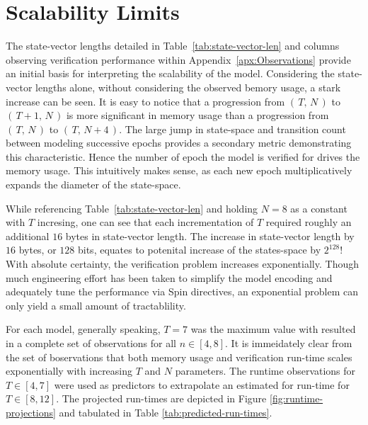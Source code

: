 \hypertarget{sec:scalability-limits}{%
\section{Scalability Limits}\label{sec:scalability-limits}}

The state-vector lengths detailed in Table\ \ref{tab:state-vector-len} and columns observing verification performance within Appendix\ \ref{apx:Observations} provide an initial basis for interpreting the scalability of the  model.
Considering the state-vector lengths alone, without considering the observed bemory usage, a stark increase can be seen.
It is easy to notice that a progression from \( (\,T,\, N\,) \) to \( (\,T+1,\, N\,) \) is more significant in memory usage than a progression from \( (\,T,\, N\,) \) to \( (\,T,\, N+4\,) \).
The large jump in state-space and transition count between modeling successive epochs provides a secondary metric demonstrating this characteristic.
Hence the number of epoch the model is verified for drives the memory usage.
This intuitively makes sense, as each new epoch multiplicatively expands the diameter of the state-space.

While referencing Table\ \ref{tab:state-vector-len} and holding \(N = 8\) as a constant with \(T\) incresing, one can see that each incrementation of \(T\) required roughly an additional \(16\) bytes in state-vector length.
The increase in state-vector length by \(16\) bytes, or \(128\) bits, equates to potenital increase of the states-space by \(2^{128}\)!
With absolute certainty, the verification problem increases exponentially.
Though much engineering effort has been taken to simplify the model encoding and adequately tune the performance via Spin directives, an exponential problem can only yield a small amount of tractablility.

For each model, generally speaking, \(T = 7\) was the maximum value with resulted in a complete set of observations for all \(n \in [4, 8]\).
It is immeidately clear from the set of boservations that both memory usage and verification run-time scales exponentially with increasing \(T\) and \(N\) parameters.
The runtime observations for \(T \in [4, 7]\) were used as predictors to extrapolate an estimated for run-time for \(T \in [8, 12]\).
The projected run-times are depicted in Figure \ref{fig:runtime-projections} and tabulated in Table \ref{tab:predicted-run-times}.

